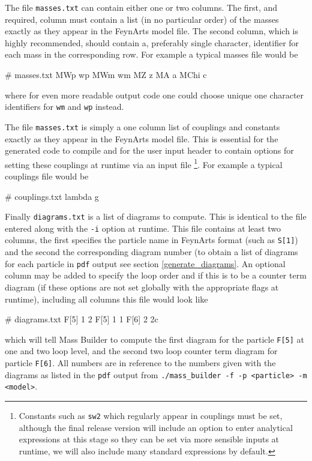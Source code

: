 The file \lstinline{masses.txt} can contain either one or two columns.  The first, and required, column must contain a list (in no particular order) of the masses exactly as they appear in the FeynArts model file.  The second column, which is highly recommended, should contain a, preferably single character, identifier for each mass in the corresponding row.  For example a typical masses file would be
\begin{lstterm}
# masses.txt
MWp          wp
MWm          wm
MZ           z
MA           a
MChi	       c
\end{lstterm}
where for even more readable output code one could choose unique one character identifiers for \lstinline{wm} and \lstinline{wp} instead.

The file \lstinline{masses.txt} is simply a one column list of couplings and constants exactly as they appear in the FeynArts model file.  This is essential for the generated code to compile and for the user input header to contain options for setting these couplings at runtime via an input file \footnote{Constants such as \lstinline{sw2} which regularly appear in couplings must be set, although the final release version will include an option to enter analytical expressions at this stage so they can be set via more sensible inputs at runtime, we will also include many standard expressions by default.}.  For example a typical couplings file would be
\begin{lstterm}
# couplings.txt
lambda
g
\end{lstterm}

Finally \lstinline{diagrams.txt} is a list of diagrams to compute.  This is identical to the file entered along with the \lstinline{-i} option at runtime.  This file contains at least two columns, the first specifies the particle name in FeynArts format (such as \lstinline{S[1]}) and the second the corresponding diagram number (to obtain a list of diagrams for each particle in \lstinline{pdf} output see section \ref{generate_diagrams}.  An optional column may be added to specify the loop order and if this is to be a counter term diagram (if these options are not set globally with the appropriate flags at runtime), including all columns this file would look like
\begin{lstterm}
# diagrams.txt
F[5]   1   2
F[5]   1   1
F[6]   2   2c
\end{lstterm}
which will tell Mass Builder to compute the first diagram for the particle \lstinline{F[5]} at one and two loop level, and the second two loop counter term diagram for particle \lstinline{F[6]}.  All numbers are in reference to the numbers given with the diagrams as listed in the \lstinline{pdf} output from \lstinline{./mass_builder -f -p <particle> -m <model>}.

